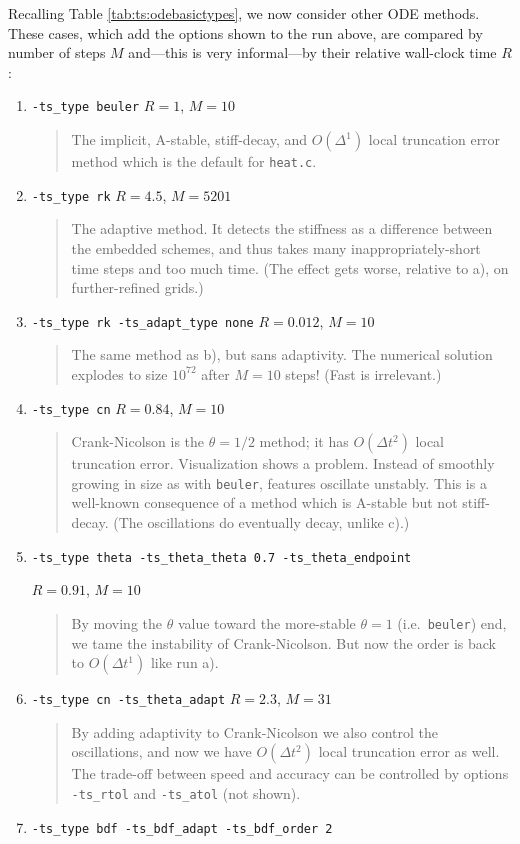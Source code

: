 Recalling Table \ref{tab:ts:odebasictypes}, we now consider other ODE methods.  These cases, which add the options shown to the run above, are compared by number of steps $M$ and---this is very informal---by their relative wall-clock time $R$:
\renewcommand{\labelenumi}{\alph{enumi})}
\begin{enumerate}
\item \texttt{-ts\_type beuler}  \hfill $R=1$, $M=10$
\begin{quote} The implicit, A-stable, stiff-decay, and $O(\Delta^1)$ local truncation error method which is the default for \texttt{heat.c}. \end{quote}
\item \texttt{-ts\_type rk}  \hfill $R=4.5$, $M=5201$
\begin{quote} The \RKthreebs adaptive method.  It detects the stiffness as a difference between the embedded schemes, and thus takes many inappropriately-short time steps and too much time.  (The effect gets worse, relative to a), on further-refined grids.) \end{quote}
\item \texttt{-ts\_type rk -ts\_adapt\_type none}  \hfill $R=0.012$, $M=10$
\begin{quote} The same method as b), but sans adaptivity.  The numerical solution explodes to size $10^{72}$ after $M=10$ steps!  (Fast is irrelevant.)\end{quote}
\item \texttt{-ts\_type cn}  \hfill $R=0.84$, $M=10$
\begin{quote} Crank-Nicolson is the $\theta=1/2$ method; it has $O(\Delta t^2)$ local truncation error.  Visualization shows a problem.  Instead of smoothly growing in size as with \texttt{beuler}, features oscillate unstably.  This is a well-known consequence of a method which is A-stable but not stiff-decay.  (The oscillations do eventually decay, unlike c).) \end{quote}
\item \texttt{-ts\_type theta -ts\_theta\_theta 0.7 -ts\_theta\_endpoint}

\hfill $R=0.91$, $M=10$
\begin{quote} By moving the $\theta$ value toward the more-stable $\theta=1$ (i.e.~\texttt{beuler}) end, we tame the instability of Crank-Nicolson.  But now the order is back to $O(\Delta t^1)$ like run a). \end{quote}
\item \texttt{-ts\_type cn -ts\_theta\_adapt}  \hfill $R=2.3$, $M=31$
\begin{quote} By adding adaptivity to Crank-Nicolson we also control the oscillations, and now we have $O(\Delta t^2)$ local truncation error as well.  The trade-off between speed and accuracy can be controlled by options \texttt{-ts\_rtol} and \texttt{-ts\_atol} (not shown).  \end{quote}
\item \texttt{-ts\_type bdf -ts\_bdf\_adapt -ts\_bdf\_order 2}


\end{enumerate}
